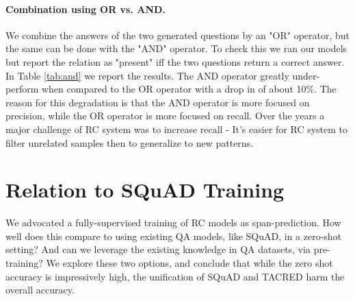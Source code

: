 \documentclass[11pt]{article}
\begin{document}
\paragraph{Combination using OR vs. AND.}
We combine the answers of the two generated questions by an "OR" operator, but the same can be done with the "AND" operator. To check this we ran our models but report the relation as "present" iff the two questions return a correct answer. In Table \ref{tab:and} we report the results. The AND operator greatly under-perform when compared to the OR operator with a drop in  of about 10\%. The reason for this degradation is that the AND operator is more focused on precision, while the OR operator is more focused on recall. Over the years a major challenge of RC system was to increase recall \cite{Ji} - It's easier for RC system to filter unrelated samples then to generalize to new patterns. 


\begin{table}[t]
\caption{{\bf Using SQuAD 2.0} Top: Evaluating SQuAD 2.0 QA model on TACRED in a zero-shot setup, using our bidirectional SP reduction. Mid:
``Fine-tuning'' the SP models on TACRED after SQuAD 2.0 per-training. Bottom: The SP model trained with out pre-training, significantly outperforming the pre-trained variants.}
\label{tab:unified}
\end{table}


\section{Relation to SQuAD Training}

We advocated a fully-supervised training of RC models as span-prediction. How well does this compare to using existing QA models, like SQuAD, in a zero-shot setting? And can we leverage the existing knowledge in QA datasets, via pre-training? We explore these two options, and conclude that while the zero shot accuracy is impressively high, the unification of SQuAD and TACRED harm the overall accuracy. 
\end{document}
